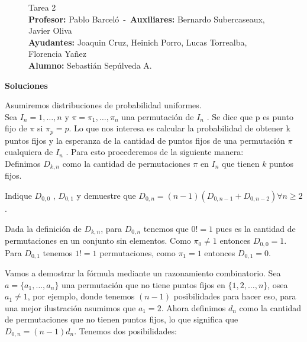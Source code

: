 \documentclass[letterpaper,10pt,table, dvipsnames]{article}
\begin{document}
\pagestyle{style2}
\begin{figure}
\centering
\begin{minipage}[c]{0.8\textwidth}
\centering
\vspace{0.3cm}
{\Large Tarea 2}
\vspace{0.3cm}\\
\textbf{Profesor:} Pablo Barceló\ -\ \textbf{Auxiliares:} Bernardo Subercaseaux, Javier Oliva\\
\textbf{Ayudantes:} Joaquin Cruz, Heinich Porro, Lucas Torrealba, Florencia Yañez\\
\textbf{Alumno:} Sebastián Sepúlveda A.
\end{minipage}
\end{figure}

\textbf{{\Large Soluciones}}
\\

\begin{tcolorbox}[colback=red!5!white,colframe=red!75!black]
 Asumiremos distribuciones de probabilidad uniformes.\\
Sea $I_n = {1,\ldots,n}$ y $\pi = \pi_1 ,\ldots,\pi_n$ una permutación de $I_n$ . Se dice que p es punto fijo de $\pi$ si $\pi_p = p$. Lo que nos interesa es calcular la probabilidad de obtener k puntos fijos y la esperanza de la cantidad de puntos fijos de una permutación $\pi$ cualquiera de $I_n$ . Para esto procederemos de la siguiente manera:\\
Definimos $D_{k,n}$ como la cantidad de permutaciones $\pi$ en $I_n$ que tienen $k$ puntos fijos.
\end{tcolorbox}

\begin{tcolorbox}
Indique $D_{0,0}$ , $D_{0,1} $ y demuestre que $D_{0,n} = (n - 1)(D_{0,n-1} + D_{0,n-2} ) \forall n \geq 2$. 
\end{tcolorbox}

Dada la definición de $D_{k,n}$, para $D_{0,n}$ tenemos que $0!=1$ pues es la cantidad de permutaciones en un conjunto sin elementos. Como $\pi_{0}\neq 1 $ entonces $D_{0,0} = 1$. Para $D_{0,1}$ tenemos $1!=1$ permutaciones, como $\pi_{1} = 1$ entonces $D_{0,1} = 0$.

Vamos a demostrar la fórmula mediante un razonamiento combinatorio. Sea $a = \{a_1,\ldots, a_n\}$ una permutación que no tiene puntos fijos en $\{1,2,\ldots,n\}$, osea $a_1\neq 1 $, por ejemplo, donde tenemos $(n-1) $ posibilidades para hacer eso, para una mejor ilustración asumimos que $a_1 =2$. Ahora definimos $d_n $ como la cantidad de permutaciones que no tienen puntos fijos, lo que significa que $D_{0,n}=(n-1)d_n $. Tenemos dos posibilidades:
\end{document}
